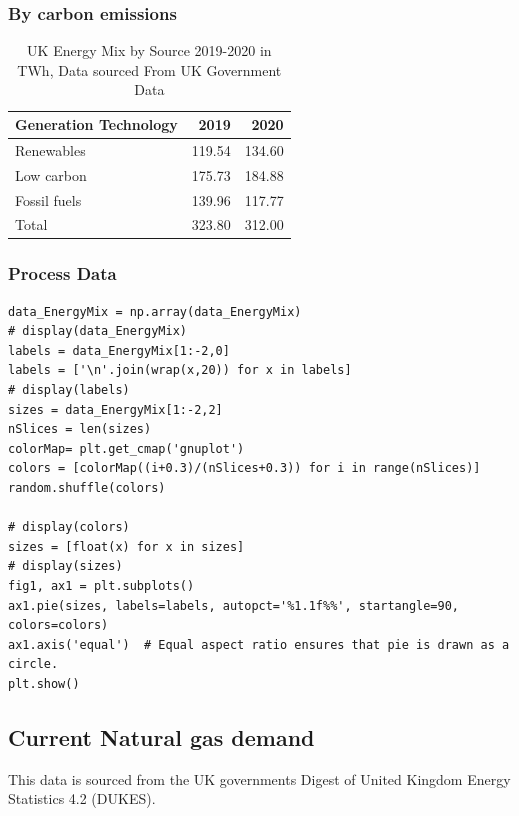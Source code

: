\documentclass[11pt]{article}
\numberwithin{equation}{section}
\begin{document}
\subsubsection{By carbon emissions}
\label{sec:org2b14614}
\begin{table}[H]
\caption{\label{tabUKEnergyMix2019to20_byCarbonEmmissions_App}UK Energy Mix by Source 2019-2020 in TWh, Data sourced From UK Government Data\cite{ukEnergyConsumptionAll}}
\centering
\begin{tabular}{lrr}
\toprule
Generation Technology & 2019 & 2020\\
\midrule
Renewables & 119.54 & 134.60\\
Low carbon & 175.73 & 184.88\\
Fossil fuels & 139.96 & 117.77\\
\midrule
Total & 323.80 & 312.00\\
\bottomrule
\end{tabular}
\end{table}

\subsubsection{Process Data}
\label{sec:org319e5da}
\begin{verbatim}
data_EnergyMix = np.array(data_EnergyMix)
# display(data_EnergyMix)
labels = data_EnergyMix[1:-2,0]
labels = ['\n'.join(wrap(x,20)) for x in labels]
# display(labels)
sizes = data_EnergyMix[1:-2,2]
nSlices = len(sizes)
colorMap= plt.get_cmap('gnuplot')
colors = [colorMap((i+0.3)/(nSlices+0.3)) for i in range(nSlices)]
random.shuffle(colors)

# display(colors)
sizes = [float(x) for x in sizes]
# display(sizes)
fig1, ax1 = plt.subplots()
ax1.pie(sizes, labels=labels, autopct='%1.1f%%', startangle=90, colors=colors)
ax1.axis('equal')  # Equal aspect ratio ensures that pie is drawn as a circle.
plt.show()
\end{verbatim}


\subsection{Current Natural gas demand \label{secAppNatGasDemand}}
\label{sec:org2b27260}
This data is sourced from the UK governments  Digest of United Kingdom Energy Statistics 4.2 (DUKES)\cite{NaturalGas}.
\end{document}
